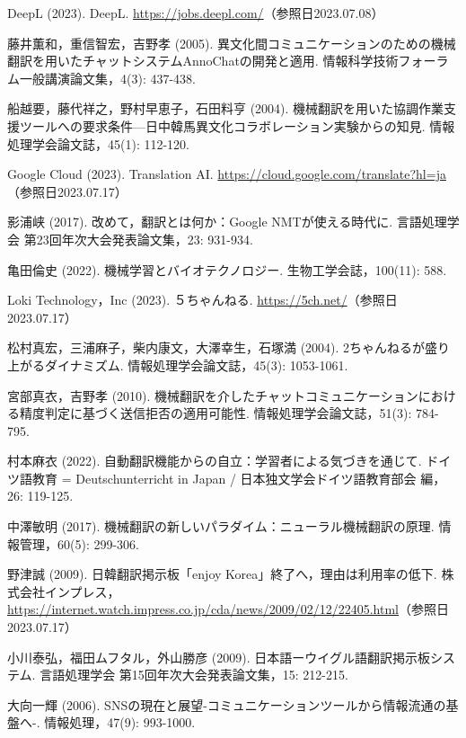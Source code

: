 \documentclass[b5paper,12pt,dvipdfmx]{jsreport}
\begin{document}
\begin{thebibliography}{99}

DeepL (2023). DeepL. \url{https://jobs.deepl.com/}（参照日2023.07.08）

藤井薫和，重信智宏，吉野孝 (2005). 異文化間コミュニケーションのための機械翻訳を用いたチャットシステムAnnoChatの開発と適用. 情報科学技術フォーラム一般講演論文集，4(3): 437-438.

船越要，藤代祥之，野村早恵子，石田料亨 (2004). 機械翻訳を用いた協調作業支援ツールへの要求条件—日中韓馬異文化コラボレーション実験からの知見. 情報処理学会論文誌，45(1): 112-120.

Google Cloud (2023). Translation AI. \url{https://cloud.google.com/translate?hl=ja}（参照日2023.07.17）

影浦峡 (2017). 改めて，翻訳とは何か：Google NMTが使える時代に. 言語処理学会 第23回年次大会発表論文集，23: 931-934.

亀田倫史 (2022). 機械学習とバイオテクノロジー. 生物工学会誌，100(11): 588.

Loki Technology，Inc (2023). ５ちゃんねる. \url{https://5ch.net/}（参照日2023.07.17）

松村真宏，三浦麻子，柴内康文，大澤幸生，石塚満 (2004). 2ちゃんねるが盛り上がるダイナミズム. 情報処理学会論文誌，45(3): 1053-1061.

宮部真衣，吉野孝 (2010). 機械翻訳を介したチャットコミュニケーションにおける精度判定に基づく送信拒否の適用可能性. 情報処理学会論文誌，51(3): 784-795.

村本麻衣 (2022). 自動翻訳機能からの自立：学習者による気づきを通じて. ドイツ語教育 = Deutschunterricht in Japan / 日本独文学会ドイツ語教育部会 編，26: 119-125.

中澤敏明 (2017). 機械翻訳の新しいパラダイム：ニューラル機械翻訳の原理. 情報管理，60(5): 299-306.

野津誠 (2009). 日韓翻訳掲示板「enjoy Korea」終了へ，理由は利用率の低下. 株式会社インプレス，\url{https://internet.watch.impress.co.jp/cda/news/2009/02/12/22405.html}（参照日2023.07.17）

小川泰弘，福田ムフタル，外山勝彦 (2009). 日本語ーウイグル語翻訳掲示板システム. 言語処理学会 第15回年次大会発表論文集，15: 212-215.

大向一輝 (2006). SNSの現在と展望-コミュニケーションツールから情報流通の基盤へ-. 情報処理，47(9): 993-1000.


\end{thebibliography}
\end{document}
